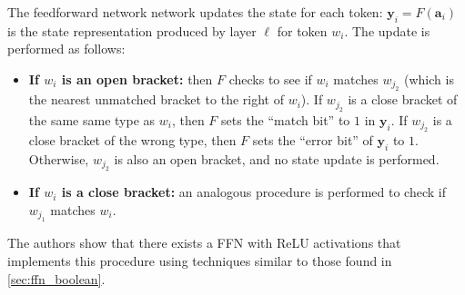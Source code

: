 The feedforward network network updates the state for each token: $\mathbf{y}_i = F(\mathbf{a}_i)$ is the state representation produced by layer $\ell$ for token $w_i$. The update is performed as follows:
\begin{itemize}
    \item \textbf{If $w_i$ is an open bracket:} then $F$ checks to see if $w_i$ matches $w_{j_2}$ (which is the nearest unmatched bracket to the right of $w_i$). If $w_{j_2}$ is a close bracket of the same same type as $w_i$, then $F$ sets the ``match bit'' to $1$ in $\mathbf{y}_i$. If $w_{j_2}$ is a close bracket of the wrong type, then $F$ sets the ``error bit'' of $\mathbf{y}_i$ to $1$. Otherwise, $w_{j_2}$ is also an open bracket, and no state update is performed.
    \item \textbf{If $w_i$ is a close bracket:} an analogous procedure is performed to check if $w_{j_1}$ matches $w_i$.
\end{itemize}
The authors show that there exists a FFN with ReLU activations that implements this procedure using techniques similar to those found in \cref{sec:ffn_boolean}.

